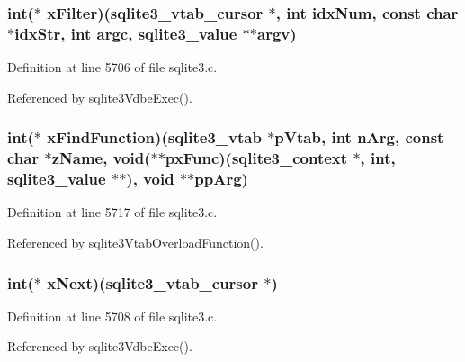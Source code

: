 \subsubsection[{x\+Filter}]{\setlength{\rightskip}{0pt plus 5cm}int($\ast$ x\+Filter)({\bf sqlite3\+\_\+vtab\+\_\+cursor} $\ast$, int idx\+Num, const char $\ast$idx\+Str, int argc, sqlite3\+\_\+value $\ast$$\ast$argv)}\label{structsqlite3__module_a699a0a4ea742b78c6f2e8303619c72c2}


Definition at line 5706 of file sqlite3.\+c.



Referenced by sqlite3\+Vdbe\+Exec().

\hypertarget{structsqlite3__module_a4cfd59ef1eee6fc5e31954e04acdc9f9}{}
\subsubsection[{x\+Find\+Function}]{\setlength{\rightskip}{0pt plus 5cm}int($\ast$ x\+Find\+Function)({\bf sqlite3\+\_\+vtab} $\ast$p\+Vtab, int n\+Arg, const char $\ast$z\+Name, void($\ast$$\ast$px\+Func)({\bf sqlite3\+\_\+context} $\ast$, int, sqlite3\+\_\+value $\ast$$\ast$), void $\ast$$\ast$pp\+Arg)}\label{structsqlite3__module_a4cfd59ef1eee6fc5e31954e04acdc9f9}


Definition at line 5717 of file sqlite3.\+c.



Referenced by sqlite3\+Vtab\+Overload\+Function().

\hypertarget{structsqlite3__module_a1c8236d4a9cf4b4b4d9ba827cee89dae}{}
\subsubsection[{x\+Next}]{\setlength{\rightskip}{0pt plus 5cm}int($\ast$ x\+Next)({\bf sqlite3\+\_\+vtab\+\_\+cursor} $\ast$)}\label{structsqlite3__module_a1c8236d4a9cf4b4b4d9ba827cee89dae}


Definition at line 5708 of file sqlite3.\+c.



Referenced by sqlite3\+Vdbe\+Exec().

\hypertarget{structsqlite3__module_a251c7aaab19d614717895337570c4ab1}{}

